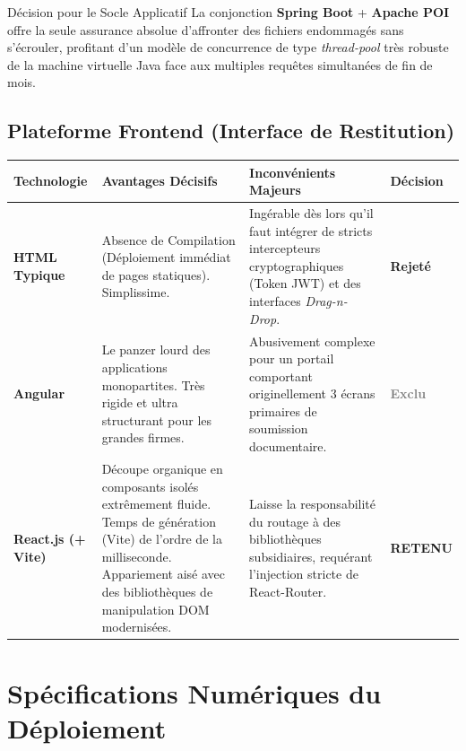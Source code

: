 \documentclass[12pt,a4paper,oneside]{report}
\begin{document}
\begin{infobox}{Décision pour le Socle Applicatif}
La conjonction \textbf{Spring Boot} + \textbf{Apache POI} offre la seule assurance absolue d'affronter des fichiers endommagés sans s'écrouler, profitant d'un modèle de concurrence de type \textit{thread-pool} très robuste de la machine virtuelle Java face aux multiples requêtes simultanées de fin de mois.
\end{infobox}

\section{Plateforme Frontend (Interface de Restitution)}

\begin{table}[H]
\centering
\small
\begin{tabular}{L{3.5cm} L{4.5cm} L{4.5cm} L{2cm}}
\toprule
\textbf{Technologie} & \textbf{Avantages Décisifs} & \textbf{Inconvénients Majeurs} & \textbf{Décision} \\
\midrule
\textbf{HTML Typique} & Absence de Compilation (Déploiement immédiat de pages statiques). Simplissime. & Ingérable dès lors qu'il faut intégrer de stricts intercepteurs cryptographiques (Token JWT) et des interfaces \textit{Drag-n-Drop}. & \textcolor{red!80!black}{\textbf{Rejeté}} \\
\midrule
\textbf{Angular} & Le panzer lourd des applications monopartites. Très rigide et ultra structurant pour les grandes firmes. & Abusivement complexe pour un portail comportant originellement 3 écrans primaires de soumission documentaire. & \textcolor{gray}{\textbf{Exclu}} \\
\midrule
\textbf{React.js (+ Vite)} & Découpe organique en composants isolés extrêmement fluide. Temps de génération (Vite) de l'ordre de la milliseconde. Appariement aisé avec des bibliothèques de manipulation DOM modernisées. & Laisse la responsabilité du routage à des bibliothèques subsidiaires, requérant l'injection stricte de React-Router. & \textcolor{green!60!black}{\textbf{RETENU}} \\
\bottomrule
\end{tabular}
\end{table}

\chapter{Spécifications Numériques du Déploiement}
\end{document}
